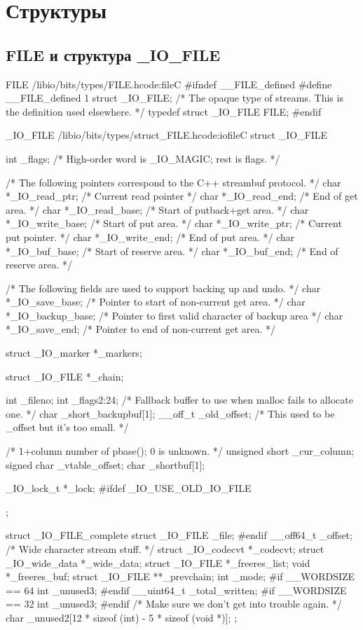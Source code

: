 \chapter{Структуры}

\section{FILE и структура \_IO\_FILE}

\begin{mylisting}{FILE /libio/bits/types/FILE.h}{code:file}{C}
#ifndef __FILE_defined
#define __FILE_defined 1
struct _IO_FILE;
/* The opaque type of streams.  This is the definition used elsewhere.  */
typedef struct _IO_FILE FILE;
#endif
\end{mylisting}

\begin{mylisting}{\_IO\_FILE /libio/bits/types/struct\_FILE.h}{code:iofile}{C}
struct _IO_FILE
{
	int _flags;		/* High-order word is _IO_MAGIC; rest is flags. */
	
	/* The following pointers correspond to the C++ streambuf protocol. */
	char *_IO_read_ptr;	/* Current read pointer */
	char *_IO_read_end;	/* End of get area. */
	char *_IO_read_base;	/* Start of putback+get area. */
	char *_IO_write_base;	/* Start of put area. */
	char *_IO_write_ptr;	/* Current put pointer. */
	char *_IO_write_end;	/* End of put area. */
	char *_IO_buf_base;	/* Start of reserve area. */
	char *_IO_buf_end;	/* End of reserve area. */
	
	/* The following fields are used to support backing up and undo. */
	char *_IO_save_base; /* Pointer to start of non-current get area. */
	char *_IO_backup_base;  /* Pointer to first valid character of backup area */
	char *_IO_save_end; /* Pointer to end of non-current get area. */
	
	struct _IO_marker *_markers;
	
	struct _IO_FILE *_chain;
	
	int _fileno;
	int _flags2:24;
	/* Fallback buffer to use when malloc fails to allocate one.  */
	char _short_backupbuf[1];
	__off_t _old_offset; /* This used to be _offset but it's too small.  */
	
	/* 1+column number of pbase(); 0 is unknown. */
	unsigned short _cur_column;
	signed char _vtable_offset;
	char _shortbuf[1];
	
	_IO_lock_t *_lock;
	#ifdef _IO_USE_OLD_IO_FILE
};

struct _IO_FILE_complete
{
	struct _IO_FILE _file;
	#endif
	__off64_t _offset;
	/* Wide character stream stuff.  */
	struct _IO_codecvt *_codecvt;
	struct _IO_wide_data *_wide_data;
	struct _IO_FILE *_freeres_list;
	void *_freeres_buf;
	struct _IO_FILE **_prevchain;
	int _mode;
	#if __WORDSIZE == 64
	int _unused3;
	#endif
	__uint64_t _total_written;
	#if __WORDSIZE == 32
	int _unused3;
	#endif
	/* Make sure we don't get into trouble again.  */
	char _unused2[12 * sizeof (int) - 5 * sizeof (void *)];
};
\end{mylisting}

